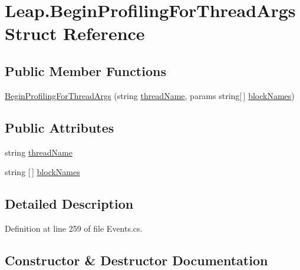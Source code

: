 \hypertarget{struct_leap_1_1_begin_profiling_for_thread_args}{}\section{Leap.\+Begin\+Profiling\+For\+Thread\+Args Struct Reference}
\label{struct_leap_1_1_begin_profiling_for_thread_args}
\subsection*{Public Member Functions}
\begin{DoxyCompactItemize}
\item 
\mbox{\hyperlink{struct_leap_1_1_begin_profiling_for_thread_args_a4e65d20ad99328f81b7eff4d481b7b26}{Begin\+Profiling\+For\+Thread\+Args}} (string \mbox{\hyperlink{struct_leap_1_1_begin_profiling_for_thread_args_aea71e9ec323e539312755f4358bfc96d}{thread\+Name}}, params string\mbox{[}$\,$\mbox{]} \mbox{\hyperlink{struct_leap_1_1_begin_profiling_for_thread_args_abffe2800fbd8fe1f4958232a90275fc9}{block\+Names}})
\end{DoxyCompactItemize}
\subsection*{Public Attributes}
\begin{DoxyCompactItemize}
\item 
string \mbox{\hyperlink{struct_leap_1_1_begin_profiling_for_thread_args_aea71e9ec323e539312755f4358bfc96d}{thread\+Name}}
\item 
string \mbox{[}$\,$\mbox{]} \mbox{\hyperlink{struct_leap_1_1_begin_profiling_for_thread_args_abffe2800fbd8fe1f4958232a90275fc9}{block\+Names}}
\end{DoxyCompactItemize}


\subsection{Detailed Description}


Definition at line 259 of file Events.\+cs.



\subsection{Constructor \& Destructor Documentation}
\mbox{\label{struct_leap_1_1_begin_profiling_for_thread_args_a4e65d20ad99328f81b7eff4d481b7b26}} 
